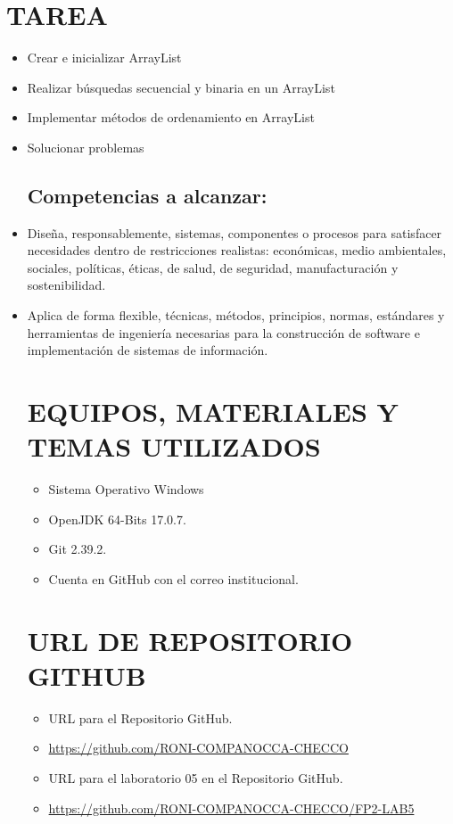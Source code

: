 \documentclass{article}
\begin{document}
    \section{TAREA}
	\begin{itemize}	
    \subsection{Objetivos:}
		\item Crear e inicializar ArrayList
		\item Realizar búsquedas secuencial y binaria en un ArrayList
        \item Implementar métodos de ordenamiento en ArrayList
        \item Solucionar problemas
    \subsection{Competencias a alcanzar:}
		\item Diseña, responsablemente, sistemas, componentes o procesos para satisfacer necesidades dentro de restricciones realistas: económicas, medio ambientales, sociales, políticas, éticas, de salud, de seguridad, manufacturación y sostenibilidad.
        \item Aplica de forma flexible, técnicas, métodos, principios, normas, estándares y herramientas de ingeniería necesarias para la construcción de software e implementación de sistemas de información.

    \section{EQUIPOS, MATERIALES Y TEMAS UTILIZADOS}
	\begin{itemize}
		\item Sistema Operativo Windows
		\item OpenJDK 64-Bits 17.0.7.
		\item Git 2.39.2.	
  	\item Cuenta en GitHub con el correo institucional.
	\end{itemize}

    \section{URL DE REPOSITORIO GITHUB}
	\begin{itemize}
		\item URL para el Repositorio GitHub.
		\item \url{https://github.com/RONI-COMPANOCCA-CHECCO}
		\item URL para el laboratorio 05 en el Repositorio GitHub.	
        \item \url{https://github.com/RONI-COMPANOCCA-CHECCO/FP2-LAB5}
	\end{itemize}
    

\end{itemize}
\end{document}
